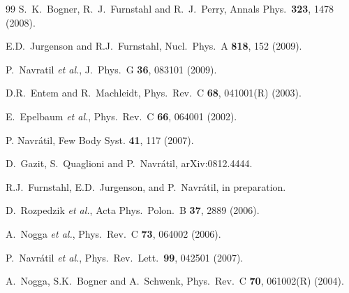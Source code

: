 \documentclass[prc,twocolumn,showpacs,floatfix,nofootinbib,superscriptaddress]{revtex4}
\begin{document}
\begin{thebibliography}{99}
  S.~K.~Bogner, R.~J.~Furnstahl and R.~J.~Perry,
  Annals Phys.\  {\bf 323}, 1478 (2008).
  
E.D.~Jurgenson and R.J.~Furnstahl,
Nucl.\ Phys.\  A {\bf 818}, 152 (2009).

  P.~Navratil \textit{et al.}, 
  J.\ Phys.\ G {\bf 36}, 083101 (2009).
    
 D.R.\ Entem and R.\ Machleidt, Phys.\ Rev.\ C \textbf{68}, 
   041001(R) (2003).

  E.~Epelbaum \textit{et al.}, 
  Phys.\ Rev.\  C {\bf 66}, 064001 (2002).

 P. Navr\'atil, Few Body Syst. {\bf 41}, 117 (2007).

  D.~Gazit, S.~Quaglioni and P.~Navr\'atil,
  arXiv:0812.4444.
    
  R.J.~Furnstahl, E.D.~Jurgenson, and P.~Navr\'atil,
  in preparation.  

  D.~Rozpedzik {\it et al.},
  Acta Phys.\ Polon.\  B {\bf 37}, 2889 (2006).
  
  A.~Nogga \textit{et al.}, 
  Phys.\ Rev.\  C {\bf 73}, 064002 (2006).

  P.~Navr\'atil \textit{et al.}, 
  Phys.\ Rev.\ Lett.\  {\bf 99}, 042501 (2007).

 A.\ Nogga, S.K.\ Bogner and A.\ Schwenk, Phys.\ Rev.\
      C \textbf{70},  061002(R) (2004).
  
\end{thebibliography}
\end{document}
